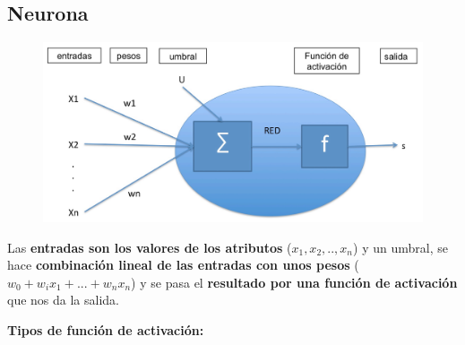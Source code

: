 \documentclass[12pt]{report} %
\begin{document}
\subsection{Neurona}

\begin{figure}[H]
	{\includegraphics[scale=.2]{image-20210312101135112.png}}
\end{figure}
Las \textbf{entradas son los valores de los atributos}
(\(x_1,x_2,..,x_n\)) y un umbral, se hace \textbf{combinación lineal de
las entradas con unos pesos} (\(w_0+w_ix_1+...+w_nx_n\)) y se pasa el
\textbf{resultado por una función de activación} que nos da la salida.

\textbf{Tipos de función de activación:}
\end{document}
